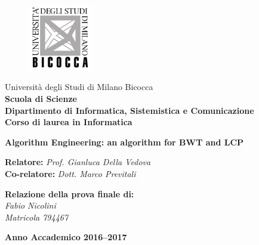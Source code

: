 \begin{titlepage}
\begin{onehalfspace}
	\begin{figure}
		\vspace*{-7mm}
		\centering
		\includegraphics[width=0.25\textwidth]{bicocca.png}
	\end{figure}
	\par
	\noindent Università degli Studi di Milano Bicocca \\
	\textbf{Scuola di Scienze \\
			Dipartimento di Informatica, Sistemistica e Comunicazione \\
			Corso di laurea in Informatica}
\end{onehalfspace}

\vfill
\par

\begin{doublespace}
\begin{center}
	{\Huge \textbf{Algorithm Engineering: an algorithm for BWT and LCP}}
\end{center}
\end{doublespace}

\vfill
\par

\begin{onehalfspace}
\begin{flushleft}
	{\large \textbf{Relatore:} \textit{Prof. Gianluca Della Vedova} \\
			\textbf{Co-relatore:} \textit{Dott. Marco Previtali}}
\end{flushleft}

\vspace{8mm}
\par

\begin{flushright}
	{\large \textbf{Relazione della prova finale di:} \\
			\textit{Fabio Nicolini} \\
			\textit{Matricola 794467}}
\end{flushright}
\end{onehalfspace}

\vfill
\par

\begin{center}
	{\large \textbf{Anno Accademico 2016--2017}}
\end{center}

\end{titlepage}